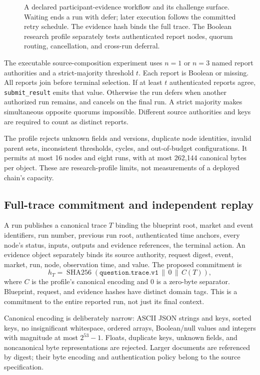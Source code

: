 \documentclass[10pt]{article}
\begin{document}
\begin{figure}[t]
\centering
\resizebox{\linewidth}{!}{}
\caption{A declared participant-evidence workflow and its challenge surface. Waiting ends a run with defer; later execution follows the committed retry schedule. The evidence hash binds the full trace. The Boolean research profile separately tests authenticated report nodes, quorum routing, cancellation, and cross-run deferral.}
\label{fig:blueprint_constitution}
\end{figure}

The executable source-composition experiment uses $n=1$ or $n=3$ named report authorities and a strict-majority threshold $t$. Each report is Boolean or missing. All reports join before terminal selection. If at least $t$ authenticated reports agree, \texttt{submit\_result} emits that value. Otherwise the run defers when another authorized run remains, and cancels on the final run. A strict majority makes simultaneous opposite quorums impossible. Different source authorities and keys are required to count as distinct reports.

The profile rejects unknown fields and versions, duplicate node identities, invalid parent sets, inconsistent thresholds, cycles, and out-of-budget configurations. It permits at most 16 nodes and eight runs, with at most 262{,}144 canonical bytes per object. These are research-profile limits, not measurements of a deployed chain's capacity.

\subsection{Full-trace commitment and independent replay}

A run publishes a canonical trace $T$ binding the blueprint root, market and event identifiers, run number, previous run root, authenticated time anchors, every node's status, inputs, outputs and evidence references, the terminal action. An evidence object separately binds its source authority, request digest, event, market, run, node, observation time, and value. The proposed commitment is
\[
 h_T=\operatorname{SHA256}(\texttt{question.trace.v1}\,\|\,0\,\|\,C(T)),
\]
where $C$ is the profile's canonical encoding and $0$ is a zero-byte separator. Blueprint, request, and evidence hashes have distinct domain tags. This is a commitment to the entire reported run, not just its final context.

Canonical encoding is deliberately narrow: ASCII JSON strings and keys, sorted keys, no insignificant whitespace, ordered arrays, Boolean/null values and integers with magnitude at most $2^{53}-1$. Floats, duplicate keys, unknown fields, and noncanonical byte representations are rejected. Larger documents are referenced by digest; their byte encoding and authentication policy belong to the source specification.
\end{document}
